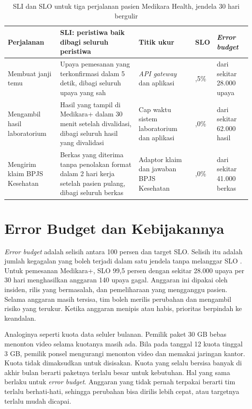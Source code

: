 \begin{table}[!htb]
  \centering
  \caption{SLI dan SLO untuk tiga perjalanan pasien Medikara Health, jendela 30 hari bergulir}
  \label{tab:ch11-sli-medikara}
  \footnotesize
  \begin{tabularx}{\textwidth}{>{\raggedright\arraybackslash}p{1.9cm} >{\raggedright\arraybackslash}X >{\raggedright\arraybackslash}p{2.3cm} >{\raggedright\arraybackslash}p{1.0cm} >{\raggedright\arraybackslash}p{2.1cm}}
    \hline
    \textbf{Perjalanan} & \textbf{SLI: peristiwa baik dibagi seluruh peristiwa} & \textbf{Titik ukur}
      & \textbf{SLO} & \textbf{\textit{Error budget}} \\ \hline
    Membuat janji temu & Upaya pemesanan yang terkonfirmasi dalam 5 detik, dibagi seluruh upaya
      yang sah & \textit{API gateway} dan aplikasi & 99,5\% & 140 dari sekitar 28.000 upaya \\ \hline
    Mengambil hasil laboratorium & Hasil yang tampil di Medikara+ dalam 30 menit setelah
      divalidasi, dibagi seluruh hasil yang divalidasi & Cap waktu sistem laboratorium dan
      aplikasi & 99,0\% & 620 dari sekitar 62.000 hasil \\ \hline
    Mengirim klaim BPJS Kesehatan & Berkas yang diterima tanpa penolakan format dalam 2 hari kerja
      setelah pasien pulang, dibagi seluruh berkas & Adaptor klaim dan jawaban BPJS Kesehatan &
      98,0\% & 820 dari sekitar 41.000 berkas \\ \hline
  \end{tabularx}
\end{table}

\section{Error Budget dan Kebijakannya}
\label{sec:ch11-error-budget}

\textit{Error budget} adalah selisih antara 100 persen dan target SLO. Selisih itu adalah jumlah
kegagalan yang boleh terjadi dalam satu jendela tanpa melanggar SLO \cite{beyer2016}. Untuk
pemesanan Medikara+, SLO 99,5 persen dengan sekitar 28.000 upaya per 30 hari menghasilkan anggaran
140 upaya gagal. Anggaran ini dipakai oleh insiden, rilis yang bermasalah, dan pemeliharaan yang
mengganggu pasien. Selama anggaran masih tersisa, tim boleh merilis perubahan dan mengambil risiko
yang terukur. Ketika anggaran menipis atau habis, prioritas berpindah ke keandalan.

Analoginya seperti kuota data seluler bulanan. Pemilik paket 30 GB bebas menonton video selama
kuotanya masih ada. Bila pada tanggal 12 kuota tinggal 3 GB, pemilik ponsel mengurangi menonton
video dan memakai jaringan kantor. Kuota tidak dimaksudkan untuk disisakan. Kuota yang selalu
bersisa banyak di akhir bulan berarti paketnya terlalu besar untuk kebutuhan. Hal yang sama
berlaku untuk \textit{error budget}. Anggaran yang tidak pernah terpakai berarti tim terlalu
berhati-hati, sehingga perubahan bisa dirilis lebih cepat, atau targetnya terlalu mudah dicapai.

